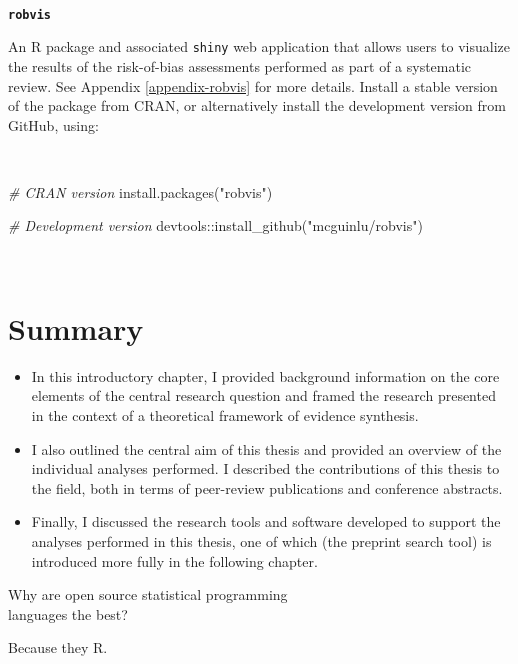 \documentclass[a4paper, twoside]{templates/ociamthesis}
\newenvironment{Shaded}{\begin{snugshade}}{\end{snugshade}}
\newcommand{\CommentTok}[1]{\textcolor[rgb]{0.56,0.35,0.01}{\textit{#1}}}
\newcommand{\FunctionTok}[1]{\textcolor[rgb]{0.00,0.00,0.00}{#1}}
\newcommand{\NormalTok}[1]{#1}
\newcommand{\SpecialCharTok}[1]{\textcolor[rgb]{0.00,0.00,0.00}{#1}}
\newcommand{\StringTok}[1]{\textcolor[rgb]{0.31,0.60,0.02}{#1}}
\renewenvironment{Shaded}
{
  \vspace{4pt}%
  \begin{snugshade}%
}{%
  \end{snugshade}%
  \vspace{4pt}%
}
\begin{document}
~

\textbf{\texttt{robvis}}

An R package and associated \texttt{shiny} web application that allows users to visualize the results of the risk-of-bias assessments performed as part of a systematic review. See Appendix \ref{appendix-robvis} for more details. Install a stable version of the package from CRAN, or alternatively install the development version from GitHub, using:

~

\begin{Shaded}
\begin{Highlighting}[]
\CommentTok{\# CRAN version}
\FunctionTok{install.packages}\NormalTok{(}\StringTok{"robvis"}\NormalTok{)}

\CommentTok{\# Development version}
\NormalTok{devtools}\SpecialCharTok{::}\FunctionTok{install\_github}\NormalTok{(}\StringTok{"mcguinlu/robvis"}\NormalTok{)}
\end{Highlighting}
\end{Shaded}

~

\hypertarget{summary}{%
\section{Summary}\label{summary}}

\begin{itemize}
\item
  In this introductory chapter, I provided background information on the core elements of the central research question and framed the research presented in the context of a theoretical framework of evidence synthesis.
\item
  I also outlined the central aim of this thesis and provided an overview of the individual analyses performed. I described the contributions of this thesis to the field, both in terms of peer-review publications and conference abstracts.
\item
  Finally, I discussed the research tools and software developed to support the analyses performed in this thesis, one of which (the preprint search tool) is introduced more fully in the following chapter.
\end{itemize}

\begin{savequote}
Why are open source statistical programming\\
languages the best?

Because they R.
\end{savequote}
\end{document}
